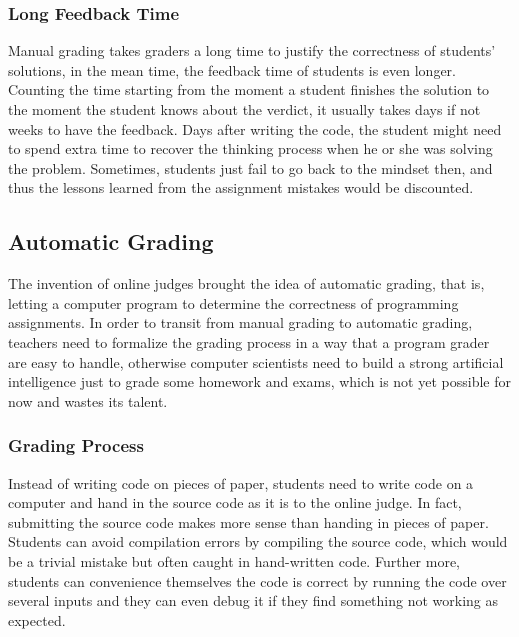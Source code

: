         \subsubsection{Long Feedback Time}

            Manual grading takes graders a long time to justify the correctness of students' solutions,
            in the mean time, the feedback time of students is even longer.
            Counting the time starting from the moment a student finishes the solution to the moment
            the student knows about the verdict, it usually takes days if not weeks to have the feedback.
            Days after writing the code, the student might need to spend extra time to recover
            the thinking process when he or she was solving the problem.
            Sometimes, students just fail to go back to the mindset then, and thus the lessons learned from
            the assignment mistakes would be discounted.

    \subsection{Automatic Grading}

        The invention of online judges brought the idea of automatic grading, that is,
        letting a computer program to determine the correctness of programming assignments.
        In order to transit from manual grading to automatic grading,
        teachers need to formalize the grading process in a way that a program grader are easy to handle,
        otherwise computer scientists need to build a strong artificial intelligence
        just to grade some homework and exams, which is not yet possible for now and wastes its talent.

        \subsubsection{Grading Process}

            Instead of writing code on pieces of paper, students need to write code on a computer
            and hand in the source code as it is to the online judge.
            In fact, submitting the source code makes more sense than handing in pieces of paper.
            Students can avoid compilation errors by compiling the source code,
            which would be a trivial mistake but often caught in hand-written code.
            Further more, students can convenience themselves the code is correct by running the code
            over several inputs and they can even debug it if they find something not working as expected.

